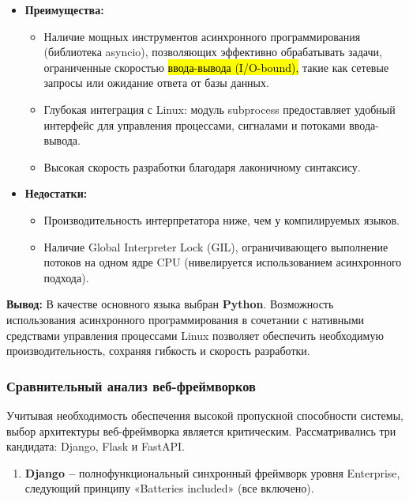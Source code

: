 \documentclass[
]{article}
\begin{document}
\begin{itemize}
\item
  \textbf{Преимущества:}

  \begin{itemize}
  \item
    Наличие мощных инструментов асинхронного программирования
    (библиотека asyncio), позволяющих эффективно обрабатывать задачи,
    ограниченные скоростью \hl{ввода-вывода (I/O-bound),} такие как
    сетевые запросы или ожидание ответа от базы данных.
  \item
    Глубокая интеграция с Linux: модуль subprocess предоставляет удобный
    интерфейс для управления процессами, сигналами и потоками
    ввода-вывода.
  \item
    Высокая скорость разработки благодаря лаконичному синтаксису.
  \end{itemize}
\item
  \textbf{Недостатки:}

  \begin{itemize}
  \item
    Производительность интерпретатора ниже, чем у компилируемых языков.
  \item
    Наличие Global Interpreter Lock (GIL), ограничивающего выполнение
    потоков на одном ядре CPU (нивелируется использованием асинхронного
    подхода).
  \end{itemize}
\end{itemize}

\textbf{Вывод:} В качестве основного языка выбран \textbf{Python}.
Возможность использования асинхронного программирования в сочетании с
нативными средствами управления процессами Linux позволяет обеспечить
необходимую производительность, сохраняя гибкость и скорость разработки.

\subsubsection{Сравнительный анализ
веб-фреймворков}\label{ux441ux440ux430ux432ux43dux438ux442ux435ux43bux44cux43dux44bux439-ux430ux43dux430ux43bux438ux437-ux432ux435ux431-ux444ux440ux435ux439ux43cux432ux43eux440ux43aux43eux432}

Учитывая необходимость обеспечения высокой пропускной способности
системы, выбор архитектуры веб-фреймворка является критическим.
Рассматривались три кандидата: Django, Flask и FastAPI.

\begin{enumerate}
\def\labelenumi{\arabic{enumi}.}
\item
  \textbf{Django --} полнофункциональный синхронный фреймворк уровня
  Enterprise, следующий принципу «Batteries included» (все включено).
\end{enumerate}
\end{document}
